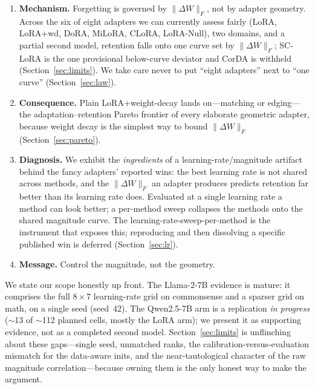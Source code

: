 \documentclass[11pt]{article}
\newcommand{\dw}{\lVert\Delta W\rVert_F}
\begin{document}
\begin{enumerate}
  \item \textbf{Mechanism.} Forgetting is governed by $\dw$, not by adapter geometry.
        Across the six of eight adapters we can currently assess fairly (LoRA, LoRA{+}wd,
        DoRA, MiLoRA, CLoRA, LoRA-Null), two domains, and a partial second model, retention
        falls onto one curve set by $\dw$; SC-LoRA is the one provisional below-curve
        deviator and CorDA is withheld (Section~\ref{sec:limits}). We take care never to
        put ``eight adapters'' next to ``one curve'' (Section~\ref{sec:law}).
  \item \textbf{Consequence.} Plain LoRA{+}weight-decay lands on---matching or
        edging---the adaptation--retention Pareto frontier of every elaborate geometric
        adapter, because weight decay is the simplest way to bound $\dw$
        (Section~\ref{sec:pareto}).
  \item \textbf{Diagnosis.} We exhibit the \emph{ingredients} of a learning-rate/magnitude
        artifact behind the fancy adapters' reported wins: the best learning rate is not
        shared across methods, and the $\dw$ an adapter produces predicts retention far
        better than its learning rate does. Evaluated at a single learning rate a method
        can look better; a per-method sweep collapses the methods onto the shared
        magnitude curve. The learning-rate-sweep-per-method is the instrument that
        exposes this; reproducing and then dissolving a specific published win is deferred
        (Section~\ref{sec:lr}).
  \item \textbf{Message.} Control the magnitude, not the geometry.
\end{enumerate}

We state our scope honestly up front. The Llama-2-7B evidence is mature: it comprises
the full $8\times 7$ learning-rate grid on commonsense and a sparser grid on math, on a
single seed (seed~42). The Qwen2.5-7B arm is a replication \emph{in progress}
($\sim$13 of $\sim$112 planned cells, mostly the LoRA arm); we present it as supporting
evidence, not as a completed second model. Section~\ref{sec:limits} is unflinching about
these gaps---single seed, unmatched ranks, the calibration-versus-evaluation mismatch
for the data-aware inits, and the near-tautological character of the raw magnitude
correlation---because owning them is the only honest way to make the argument.

\end{document}

